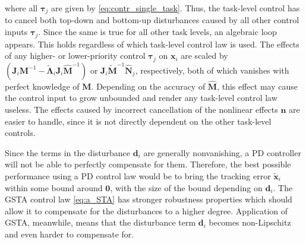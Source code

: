 \documentclass[../main.tex]{subfiles}
\begin{document}
where all $\bm{\tau}_j$ are given by \eqref{eq:contr_single_task}. Thus, the task-level control has to cancel both top-down and bottom-up disturbances caused by all other control inputs $\bm{\tau}_j$. Since the same is true for all other task levels, an algebraic loop appears. This holds regardless of which task-level control law is used. The effects of any higher- or lower-priority control $\bm{\tau}_j$ on $\bm{x}_i$ are scaled by $\left(\bm{J}_i\bm{M}^{-1} - \tilde{\bm{\Lambda}}_i \bm{J}_i\hat{\bm{M}}^{-1}\right)$ or $\bm{J}_i\tilde{\bm{M}}^{-1}\hat{\bm{N}}_j$, respectively, both of which vanishes with perfect knowledge of $\bm{M}$. Depending on the accuracy of $\hat{\bm{M}}$, this effect may cause the control input to grow unbounded and render any task-level control law useless. The effects caused by incorrect cancellation of the nonlinear effects $\bm{n}$ are easier to handle, since it is not directly dependent on the other task-level controls.

Since the terms in the disturbance $\bm{d}_i$ are generally nonvanishing, a PD controller will not be able to perfectly compensate for them. Therefore, the best possible performance using a PD control law would be to bring the tracking error $\tilde{\bm{x}}_i$ within some bound around $\bm{0}$, with the size of the bound depending on $\bm{d}_i$. The GSTA control law \eqref{eq:a_STA} has stronger robustness properties which should allow it to compensate for the disturbances to a higher degree. Application of GSTA, meanwhile, means that the disturbance term $\bm{d}_i$ becomes non-Lipschitz and even harder to compensate for.  %
\end{document}
